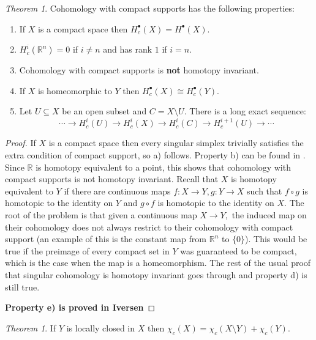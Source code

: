 \documentclass[BSc]{usydthesis}
\numberwithin{equation}{chapter}
\theoremstyle{remark}
\newtheorem{Theorem}[equation]{Theorem}
\newcommand{\R}{\mathbb{R}}
\begin{document}
\begin{Theorem} 
Cohomology with compact supports has the following properties:
 
\end{Theorem}

\begin{enumerate}\label{CompactProps}
 
 \item If $X$ is a compact space then $H_c^{\bullet}(X) = H^{\bullet}(X).$
 \item $H^i_c(\mathbb{R}^n)= 0$ if $i\neq n$ and has rank $1$ if $i=n.$
 \item Cohomology with compact supports is {\bf not} homotopy invariant.
 \item If $X$ is homeomorphic to $Y$ then $H^{\bullet}_c(X) \cong H^{\bullet}_c(Y).$
 \item Let $U\subseteq X$ be an open subset and $C= X\setminus U.$ There is a long exact sequence: $$ \cdots \to H^i_c(U) \to H^i_c (X) \to H^i_c (C) \to H^{i+1}_c (U) \to \cdots$$

\end{enumerate}


\begin{proof}
  If $X$ is a compact space then every singular simplex trivially satisfies the extra condition of compact support, so a) follows. Property b) can be found in \cite[3.34]{Hatcher}. Since $\R$ is homotopy equivalent to a point, this shows that cohomology with compact supports is not homotopy invariant. Recall that $X$ is homotopy equivalent to $Y$ if there are continuous maps $f:X\to Y, g:Y\to X$ such that $f\circ g$ is homotopic to the identity on $Y$ and $g\circ f$ is homotopic to the identity on $X.$ The root of the problem is that given a continuous map $X\to Y,$ the induced map on their cohomology does not always restrict to their cohomology with compact support (an example of this is the constant map from $\R^n$ to $\{ 0 \}$). This would be true if the preimage of every compact set in $Y$ was guaranteed to be compact, which is the case when the map is a homeomorphism. The rest of the usual proof that singular cohomology is homotopy invariant goes through and property d) is still true.  
  
  {\bf Property e) is proved in Iversen}
\end{proof}


\begin{Theorem}\label{EulerAdditive}
If $Y$ is locally closed in $X$ then $\chi_c(X) = \chi_c(X\setminus Y) + \chi_c(Y).$
\end{Theorem}
\end{document}
